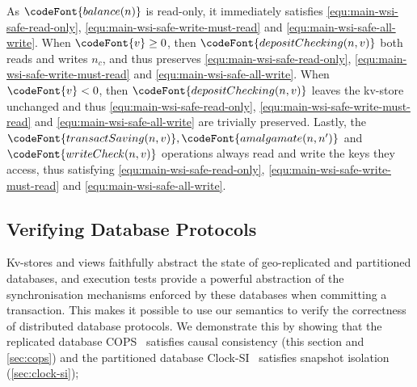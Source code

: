 As \(\codeFont{balance(n)} \) is read-only, it immediately satisfies \eqref{equ:main-wsi-safe-read-only}, \eqref{equ:main-wsi-safe-write-must-read} and \eqref{equ:main-wsi-safe-all-write}.
When $\codeFont{v} \geq 0$, then \(\codeFont{depositChecking(n,v)} \) both reads and writes \( n_c \), and thus preserves  
\eqref{equ:main-wsi-safe-read-only}, \eqref{equ:main-wsi-safe-write-must-read} and \eqref{equ:main-wsi-safe-all-write}.
When $\codeFont{v} < 0$, then  \(\codeFont{depositChecking(n,v)} \) leaves the kv-store unchanged and thus \eqref{equ:main-wsi-safe-read-only}, \eqref{equ:main-wsi-safe-write-must-read} and \eqref{equ:main-wsi-safe-all-write} are trivially preserved.
Lastly, the
\( \codeFont{transactSaving(n,v)}, \codeFont{amalgamate(n,n')} \) and \( \codeFont{writeCheck(n,v)}\) operations
always read and write the keys they access, thus satisfying \eqref{equ:main-wsi-safe-read-only}, \eqref{equ:main-wsi-safe-write-must-read} and \eqref{equ:main-wsi-safe-all-write}.


\subsection{Verifying Database Protocols}
\label{sec:verify-impl}
Kv-stores and views faithfully abstract the state of geo-replicated and partitioned
databases, and  execution tests provide a powerful abstraction of the synchronisation mechanisms  enforced by these databases when committing a transaction. This makes it
possible to use our 
semantics to verify the correctness of distributed database protocols. 
We  demonstrate this by showing that  the replicated database 
COPS~\cite{cops} satisfies causal consistency  (this section and \cref{sec:cops}) and
the partitioned database Clock-SI~\cite{clocksi} satisfies snapshot isolation (\cref{sec:clock-si}); 


